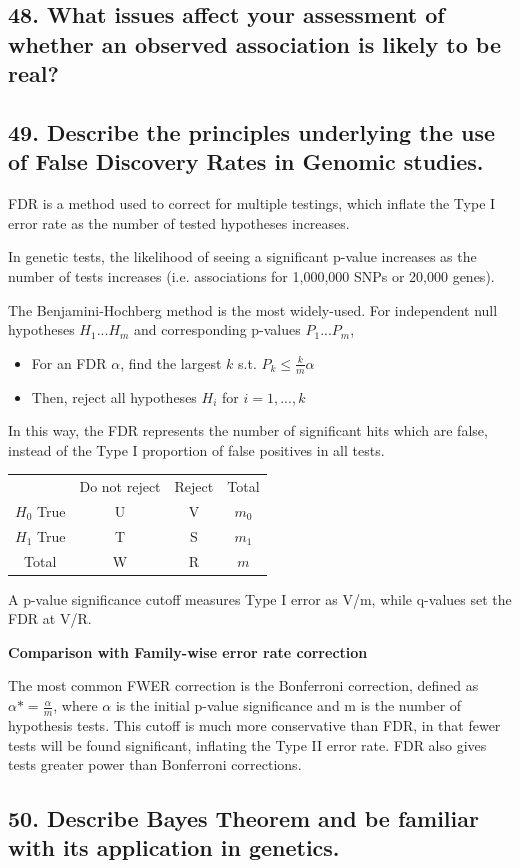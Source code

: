 \documentclass{tufte-handout}
\theoremstyle{noparens}
\begin{document}
\newpage
\subsection{48. What issues affect your assessment of whether an observed association is likely to be real?}

\newpage
\subsection{49. Describe the principles underlying the use of False Discovery Rates in Genomic studies.}

FDR is a method used to correct for multiple testings, which inflate the Type I error rate as the number of tested hypotheses increases.

In genetic tests, the likelihood of seeing a significant p-value increases as the number of tests increases (i.e. associations for 1,000,000 SNPs or 20,000 genes).

The Benjamini-Hochberg method is the most widely-used. For independent null hypotheses $H_1 ... H_m$ and corresponding p-values $P_1 ... P_m$,

\begin{itemize}
	\item For an FDR $\alpha$, find the largest $k$ s.t. $P_k \leq \frac{k}{m}\alpha$
	\item Then, reject all hypotheses $H_i$ for $i = 1,...,k$
\end{itemize}

In this way, the FDR represents the number of significant hits which are false, instead of the Type I proportion of false positives in all tests.

\begin{tabular}{c cc|c}
	  & Do not reject & Reject & Total \\ 
 $H_0$ True & U & V & $m_0$ \\ 
 $H_1$ True & T & S & $m_1$ \\ 
	\hline Total & W & R & $m$ \\  
\end{tabular} 

A p-value significance cutoff measures Type I error as V/m, while q-values set the FDR at V/R.

\textbf{Comparison with Family-wise error rate correction}

The most common FWER correction is the Bonferroni correction, defined as $\alpha* = \frac{\alpha}{m}$, where $\alpha$ is the initial p-value significance and m is the number of hypothesis tests. This cutoff is much more conservative than FDR, in that fewer tests will be found significant, inflating the Type II error rate. FDR also gives tests greater power than Bonferroni corrections.


\newpage
\subsection{50. Describe Bayes Theorem and be familiar with its application in genetics.}
\end{document}
